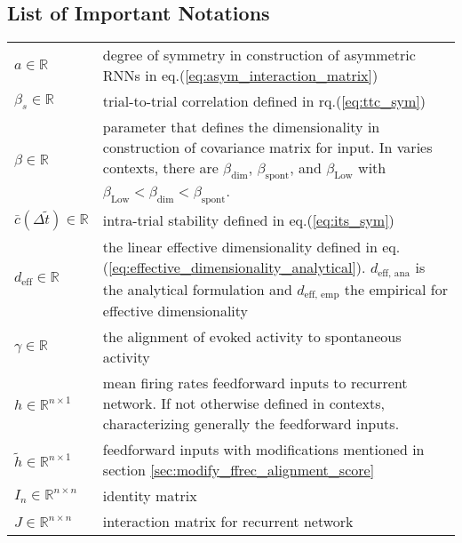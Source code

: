 \documentclass[11pt]{article}
\begin{document}
	\subsection{List of Important Notations}
	\begin{table}[H]
		\begin{tabularx}{\textwidth}{lX}
			$a \in \mathbb{R}$ & degree of symmetry in construction of asymmetric RNNs in eq.(\ref{eq:asym_interaction_matrix}) \\
			
			$\beta_s \in \mathbb{R}$ & trial-to-trial correlation defined in rq.(\ref{eq:ttc_sym}) \\
			
			$\beta \in \mathbb{R}$ & parameter that defines the dimensionality in construction of covariance matrix for input. In varies contexts, there are $\beta_{\text{dim}}$, $\beta_{\text{spont}}$, and $\beta_{\text{Low}}$ with $\beta_{\text{Low}} < \beta_{\text{dim}} < \beta_{\text{spont}}$.\\
			
			$\bar{c}{(\Delta \tilde{t})} \in \mathbb{R}$ & intra-trial stability defined in eq.(\ref{eq:its_sym}) \\
			
			$d_{\text{eff}} \in \mathbb{R}$ & the linear effective dimensionality defined in eq.(\ref{eq:effective_dimensionality_analytical}). $d_{\text{eff, ana}}$ is the analytical formulation and $d_{\text{eff, emp}}$ the empirical for effective dimensionality \\
			
			$\gamma \in \mathbb{R}$ & the alignment of evoked activity to spontaneous activity\\ %
			
			$h \in \mathbb{R}^{n \times 1}$  & mean firing rates feedforward inputs to recurrent network. If not otherwise defined in contexts, characterizing generally the feedforward inputs.\\
			
			$\tilde{h} \in \mathbb{R}^{n \times 1}$ & feedforward inputs with modifications mentioned in section \ref{sec:modify_ffrec_alignment_score} \\
			
			$I_n \in \mathbb{R}^{n \times n}$ & identity matrix \\
			
			$J \in \mathbb{R}^{n \times n}$  & interaction matrix for recurrent network\\
			

\end{tabularx}
\end{table}
\end{document}
